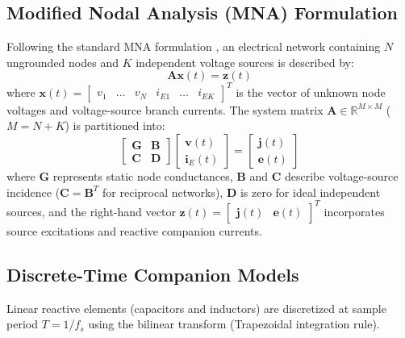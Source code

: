 \documentclass[fleqn,final]{jaes}
\begin{document}
\subsection{Modified Nodal Analysis (MNA) Formulation}
Following the standard MNA formulation \cite{ho1975modified, yeh2007automated}, an electrical network containing $N$ ungrounded nodes and $K$ independent voltage sources is described by:
\begin{equation}
\mathbf{A} \mathbf{x}(t) = \mathbf{z}(t)
\end{equation}
where $\mathbf{x}(t) = \begin{bmatrix} v_1 & \dots & v_N & i_{E1} & \dots & i_{EK} \end{bmatrix}^T$ is the vector of unknown node voltages and voltage-source branch currents. The system matrix $\mathbf{A} \in \mathbb{R}^{M \times M}$ ($M = N + K$) is partitioned into:
\begin{equation}
\begin{bmatrix} \mathbf{G} & \mathbf{B} \\ \mathbf{C} & \mathbf{D} \end{bmatrix} \begin{bmatrix} \mathbf{v}(t) \\ \mathbf{i}_E(t) \end{bmatrix} = \begin{bmatrix} \mathbf{j}(t) \\ \mathbf{e}(t) \end{bmatrix}
\end{equation}
where $\mathbf{G}$ represents static node conductances, $\mathbf{B}$ and $\mathbf{C}$ describe voltage-source incidence ($\mathbf{C} = \mathbf{B}^T$ for reciprocal networks), $\mathbf{D}$ is zero for ideal independent sources, and the right-hand vector $\mathbf{z}(t) = \begin{bmatrix} \mathbf{j}(t) & \mathbf{e}(t) \end{bmatrix}^T$ incorporates source excitations and reactive companion currents.

\subsection{Discrete-Time Companion Models}
Linear reactive elements (capacitors and inductors) are discretized at sample period $T = 1 / f_s$ using the bilinear transform (Trapezoidal integration rule).
\end{document}
